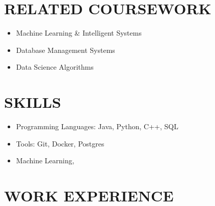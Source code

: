 \documentclass[11pt, a4paper, roman]{moderncv}
\begin{document}

\section{RELATED COURSEWORK}
{\begin{itemize}
    \item Machine Learning \& Intelligent Systems
    \item Database Management Systems
    \item Data Science Algorithms
  \end{itemize}
} 

\section{SKILLS}
{\begin{itemize}
	\item Programming Languages: Java, Python, C++, SQL
	\item Tools: Git, Docker, Postgres
	\item Machine Learning, 

\end{itemize}
}

\section{WORK EXPERIENCE}
\end{document}
